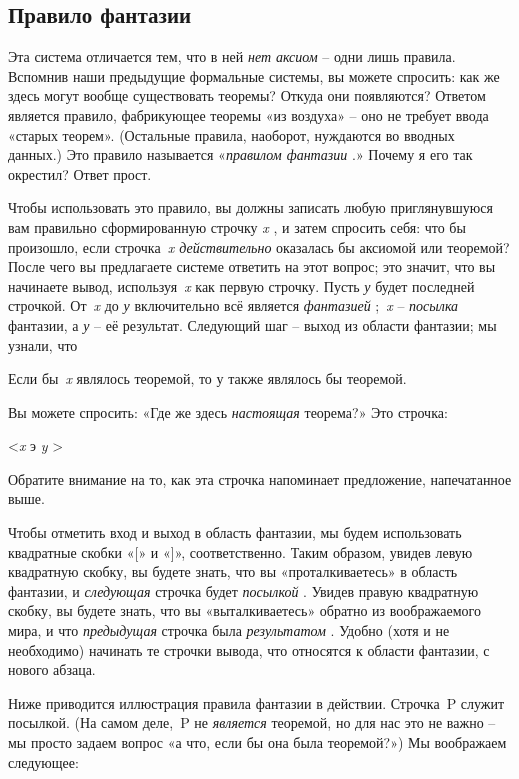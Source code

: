 \documentclass[../main.tex]{subfiles}
\begin{document}
\subsection{Правило фантазии}

Эта система отличается тем, что в ней \emph{нет аксиом} \--- одни лишь правила. Вспомнив наши предыдущие формальные системы, вы можете спросить: как же здесь могут вообще существовать теоремы? Откуда они появляются? Ответом является правило, фабрикующее теоремы «из воздуха» \--- оно не требует ввода «старых теорем». (Остальные правила, наоборот, нуждаются во вводных данных.) Это правило называется «\emph{правилом фантазии} .» Почему я его так окрестил? Ответ прост.

Чтобы использовать это правило, вы должны записать любую приглянувшуюся вам правильно сформированную строчку \emph{x} , и затем спросить себя: что бы произошло, если строчка~\emph{x действительно} оказалась бы аксиомой или теоремой? После чего вы предлагаете системе ответить на этот вопрос; это значит, что вы начинаете вывод, используя~\emph{x} как первую строчку. Пусть \emph{у} будет последней строчкой. От~\emph{x} до \emph{у} включительно всё является \emph{фантазией} ;~\emph{x} \--- \emph{посылка} фантазии, а \emph{у} \--- её результат. Следующий шаг \--- выход из области фантазии; мы узнали, что

Если бы~\emph{x} являлось теоремой, то у также являлось бы теоремой.

Вы можете спросить: «Где же здесь \emph{настоящая} теорема?» Это строчка:

\textless{}\emph{x} э \emph{y} \textgreater{}

Обратите внимание на то, как эта строчка напоминает предложение, напечатанное выше.

Чтобы отметить вход и выход в область фантазии, мы будем использовать квадратные скобки «{[}» и «{]}», соответственно. Таким образом, увидев левую квадратную скобку, вы будете знать, что вы «проталкиваетесь» в область фантазии, и \emph{следующая} строчка будет \emph{посылкой} . Увидев правую квадратную скобку, вы будете знать, что вы «выталкиваетесь» обратно из воображаемого мира, и что \emph{предыдущая} строчка была \emph{результатом} . Удобно (хотя и не необходимо) начинать те строчки вывода, что относятся к области фантазии, с нового абзаца.

Ниже приводится иллюстрация правила фантазии в действии. Строчка~P служит посылкой. (На самом деле,~P не \emph{является} теоремой, но для нас это не важно \--- мы просто задаем вопрос «а что, если бы она была теоремой?») Мы воображаем следующее:
\end{document}
